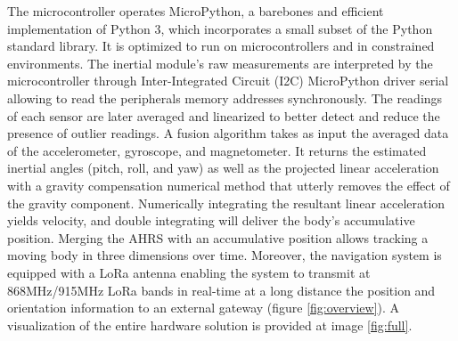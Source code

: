 The microcontroller operates MicroPython, a barebones and efficient implementation of Python 3, which incorporates a small subset of the Python standard library. It is optimized to run on microcontrollers and in constrained environments. The inertial module's raw measurements are interpreted by the microcontroller through Inter-Integrated Circuit (I2C) MicroPython driver serial allowing to read the peripherals memory addresses synchronously. The readings of each sensor are later averaged and linearized to better detect and reduce the presence of outlier readings. A fusion algorithm takes as input the averaged data of the accelerometer, gyroscope, and magnetometer. It returns the estimated inertial angles (pitch, roll, and yaw) as well as the projected linear acceleration with a gravity compensation numerical method that utterly removes the effect of the gravity component. Numerically integrating the resultant linear acceleration yields velocity, and double integrating will deliver the body's accumulative position. Merging the AHRS with an accumulative position allows tracking a moving body in three dimensions over time. Moreover, the navigation system is equipped with a LoRa antenna enabling the system to transmit at 868MHz/915MHz LoRa bands in real-time at a long distance the position and orientation information to an external gateway (figure \ref{fig:overview}). A visualization of the entire hardware solution is provided at image \ref{fig:full}.

